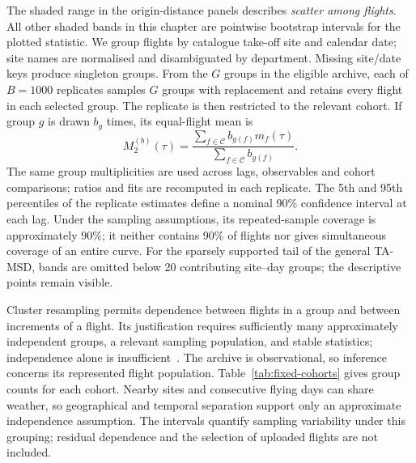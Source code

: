 The shaded range in the origin-distance panels describes \emph{scatter among flights}.
All other shaded bands in this chapter are pointwise bootstrap intervals for the
plotted statistic. We group flights by catalogue take-off site and calendar date;
site names are normalised and disambiguated by department. Missing site/date keys
produce singleton groups. From the $G$ groups in the eligible archive, each of
$B=1000$ replicates samples $G$ groups with replacement and retains every flight
in each selected group. The replicate is then restricted to the relevant cohort.
If group $g$ is drawn $b_g$ times, its equal-flight mean is
\begin{equation}
 M_2^{(b)}(\tau)=
 \frac{\sum_{f\in\mathcal C}b_{g(f)}m_f(\tau)}
      {\sum_{f\in\mathcal C}b_{g(f)}}.
 \label{eq:fixed-bootstrap}
\end{equation}
The same group multiplicities are used across lags, observables and cohort comparisons;
ratios and fits are recomputed in each replicate. The 5th and 95th percentiles of the
replicate estimates define a nominal 90\% confidence interval at each lag. Under the
sampling assumptions, its repeated-sample coverage is approximately 90\%; it neither
contains 90\% of flights nor gives simultaneous coverage of an entire curve.
For the sparsely supported tail of the general TA-MSD, bands are omitted below
20 contributing site--day groups; the descriptive points remain visible.

Cluster resampling permits dependence between flights in a group and between
increments of a flight. Its justification requires sufficiently many approximately
independent groups, a relevant sampling population, and stable statistics; independence
alone is insufficient~\cite{cameron_miller2015}. The archive is observational, so inference
concerns its represented flight population. Table~\ref{tab:fixed-cohorts} gives group
counts for each cohort. 
Nearby sites and consecutive flying days can share weather, so geographical and temporal
separation support only an approximate independence assumption. The intervals quantify
sampling variability under this grouping; residual dependence and the selection of
uploaded flights are not included.

